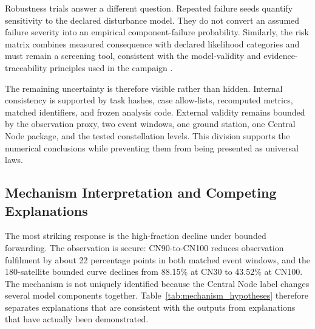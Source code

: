 Robustness trials answer a different question. Repeated failure seeds quantify sensitivity to the declared disturbance model. They do not convert an assumed failure severity into an empirical component-failure probability. Similarly, the risk matrix combines measured consequence with declared likelihood categories and must remain a screening tool, consistent with the model-validity and evidence-traceability principles used in the campaign \citep{NASA2016SEHandbook,NASAStd7009,NASA2024RiskManagement}.

The remaining uncertainty is therefore visible rather than hidden. Internal consistency is supported by task hashes, case allow-lists, recomputed metrics, matched identifiers, and frozen analysis code. External validity remains bounded by the observation proxy, two event windows, one ground station, one Central Node package, and the tested constellation levels. This division supports the numerical conclusions while preventing them from being presented as universal laws.

\clearpage
\subsection{Mechanism Interpretation and Competing Explanations}
\label{sec:mechanism_competing}

The most striking response is the high-fraction decline under bounded forwarding. The observation is secure: CN90-to-CN100 reduces observation fulfilment by about 22 percentage points in both matched event windows, and the 180-satellite bounded curve declines from 88.15\% at CN30 to 43.52\% at CN100. The mechanism is not uniquely identified because the Central Node label changes several model components together. Table~\ref{tab:mechanism_hypotheses} therefore separates explanations that are consistent with the outputs from explanations that have actually been demonstrated.

